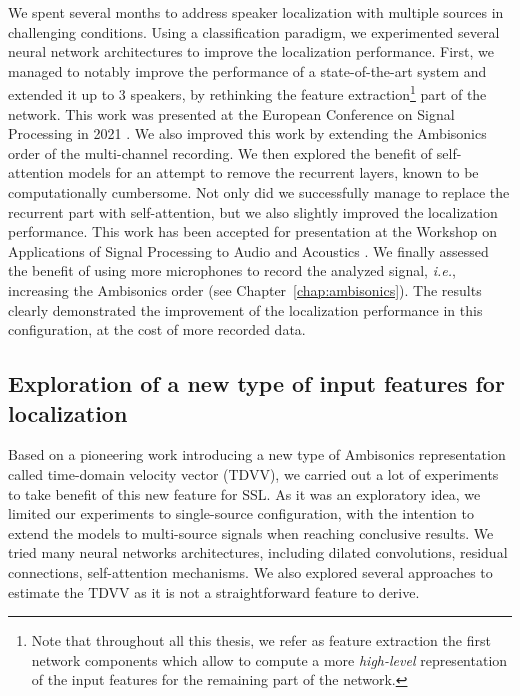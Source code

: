 We spent several months to address speaker localization with multiple sources in challenging conditions. Using a classification paradigm, we experimented several neural network architectures to improve the localization performance. First, we managed to notably improve the performance of a state-of-the-art system \cite{perotin_crnn-based_2019} and extended it up to 3 speakers, by rethinking the feature extraction\footnote{Note that throughout all this thesis, we refer as feature extraction the first network components which allow to compute a more \textit{high-level} representation of the input features for the remaining part of the network.} part of the network. This work was presented at the European Conference on Signal Processing in 2021 \cite{grumiaux_improved_2021}. We also improved this work by extending the Ambisonics order of the multi-channel recording. We then explored the benefit of self-attention models for an attempt to remove the recurrent layers, known to be computationally cumbersome. Not only did we successfully manage to replace the recurrent part with self-attention, but we also slightly improved the localization performance. This work has been accepted for presentation at the Workshop on Applications of Signal Processing to Audio and Acoustics \cite{grumiaux_saladnet_2021}. We finally assessed the benefit of using more microphones to record the analyzed signal, \emph{i.e.}, increasing the Ambisonics order (see Chapter~\ref{chap:ambisonics}). The results clearly demonstrated the improvement of the localization performance in this configuration, at the cost of more recorded data.

\subsection{Exploration of a new type of input features for localization}

Based on a pioneering work \cite{daniel_time_2020} introducing a new type of Ambisonics representation called time-domain velocity vector (TDVV), we carried out a lot of experiments to take benefit of this new feature for SSL. As it was an exploratory idea, we limited our experiments to single-source configuration, with the intention to extend the models to multi-source signals when reaching conclusive results. We tried many neural networks architectures, including dilated convolutions, residual connections, self-attention mechanisms. We also explored several approaches to estimate the TDVV as it is not a straightforward feature to derive.

